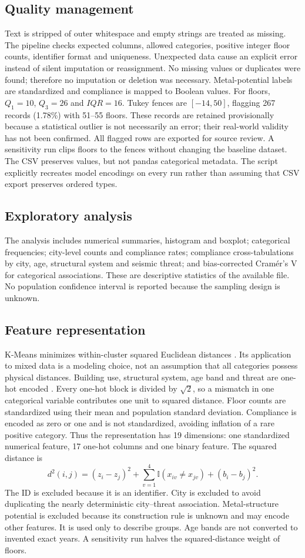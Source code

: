 \documentclass[conference]{IEEEtran}
\begin{document}
\subsection{Quality management}
Text is stripped of outer whitespace and empty strings are treated as missing. The pipeline checks expected columns, allowed categories, positive integer floor counts, identifier format and uniqueness. Unexpected data cause an explicit error instead of silent imputation or reassignment. No missing values or duplicates were found; therefore no imputation or deletion was necessary. Metal-potential labels are standardized and compliance is mapped to Boolean values.
For floors, $Q_1=10$, $Q_3=26$ and $IQR=16$. Tukey fences are $[-14,50]$, flagging 267 records (1.78\%) with 51--55 floors. These records are retained provisionally because a statistical outlier is not necessarily an error; their real-world validity has not been confirmed. All flagged rows are exported for source review. A sensitivity run clips floors to the fences without changing the baseline dataset.
The CSV preserves values, but not pandas categorical metadata. The script explicitly recreates model encodings on every run rather than assuming that CSV export preserves ordered types.
\subsection{Exploratory analysis}
The analysis includes numerical summaries, histogram and boxplot; categorical frequencies; city-level counts and compliance rates; compliance cross-tabulations by city, age, structural system and seismic threat; and bias-corrected Cramér's V for categorical associations. These are descriptive statistics of the available file. No population confidence interval is reported because the sampling design is unknown.
\subsection{Feature representation}
K-Means minimizes within-cluster squared Euclidean distances \cite{kmeans}. Its application to mixed data is a modeling choice, not an assumption that all categories possess physical distances. Building use, structural system, age band and threat are one-hot encoded \cite{onehot}. Every one-hot block is divided by $\sqrt{2}$, so a mismatch in one categorical variable contributes one unit to squared distance. Floor counts are standardized using their mean and population standard deviation. Compliance is encoded as zero or one and is not standardized, avoiding inflation of a rare positive category.
Thus the representation has 19 dimensions: one standardized numerical feature, 17 one-hot columns and one binary feature. The squared distance is
\begin{equation}
 d^2(i,j)=(z_i-z_j)^2+\sum_{v=1}^{4}\mathbb{I}(x_{iv}\ne x_{jv})+(b_i-b_j)^2.
\end{equation}
The ID is excluded because it is an identifier. City is excluded to avoid duplicating the nearly deterministic city--threat association. Metal-structure potential is excluded because its construction rule is unknown and may encode other features. It is used only to describe groups. Age bands are not converted to invented exact years. A sensitivity run halves the squared-distance weight of floors.
\end{document}
